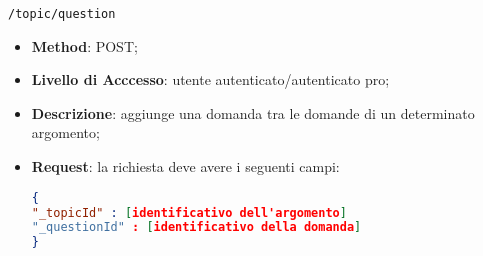 \item \texttt{/topic/question}
		\begin{itemize}
			\item \textbf{Method}: POST;
			\item \textbf{Livello di Acccesso}: utente autenticato/autenticato pro;
			\item \textbf{Descrizione}: aggiunge una domanda tra le domande di un determinato argomento;
			\item \textbf{Request}: la richiesta deve avere i seguenti campi:
\begin{lstlisting}[language=json,firstnumber=1]
{
"_topicId" : [identificativo dell'argomento]
"_questionId" : [identificativo della domanda]
}
\end{lstlisting}
		\end{itemize}